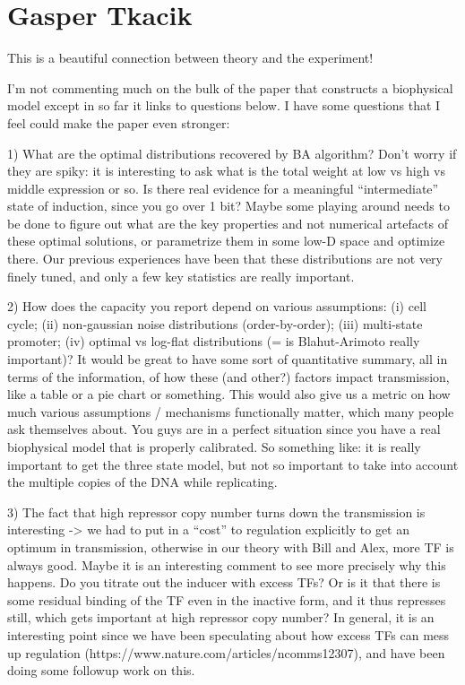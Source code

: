 \section{Gasper Tkacik}

This is a beautiful connection between theory and the experiment!

I’m not commenting much on the bulk of the paper that constructs a biophysical
model except in so far it links to questions below.  I have some questions that
I feel could make the paper even stronger:

\begin{tcolorbox}
1) What are the optimal distributions recovered by BA algorithm? Don’t worry if
they are spiky: it is interesting to ask what is the total weight at low vs high
vs middle expression or so. Is there real evidence for a meaningful
“intermediate” state of induction, since you go over 1 bit? Maybe some playing
around needs to be done to figure out what are the key properties and not
numerical artefacts of these optimal solutions, or parametrize them in some
low-D space and optimize there. Our previous experiences have been that these
distributions are not very finely tuned, and only a few key statistics are
really important.
\end{tcolorbox}

\begin{tcolorbox}
2) How does the capacity you report depend on various assumptions: (i) cell
cycle; (ii) non-gaussian noise distributions (order-by-order); (iii) multi-state
promoter; (iv) optimal vs log-flat distributions (= is Blahut-Arimoto really
important)? It would be great to have some sort of quantitative summary, all in
terms of the information, of how these (and other?) factors impact transmission,
like a table or a pie chart or something. This would also give us a metric on
how much various assumptions / mechanisms functionally matter, which many people
ask themselves about. You guys are in a perfect situation since you have a real
biophysical model that is properly calibrated. So something like: it is really
important to get the three state model, but not so important to take into
account the multiple copies of the DNA while replicating.
\end{tcolorbox}

\begin{tcolorbox}
3) The fact that high repressor copy number turns down the transmission is
interesting -> we had to put in a “cost” to regulation explicitly to get an
optimum in transmission, otherwise in our theory with Bill and Alex, more TF is
always good. Maybe it is an interesting comment to see more precisely why this
happens. Do you titrate out the inducer with excess TFs? Or is it that there is
some residual binding of the TF even in the inactive form, and it thus represses
still, which gets important at high repressor copy number? In general, it is an
interesting point since we have been speculating about how excess TFs can mess
up regulation (https://www.nature.com/articles/ncomms12307), and have been doing
some followup work on this.
\end{tcolorbox}

